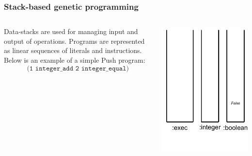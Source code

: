 \documentclass{beamer}
\newcommand{\linespace}{\vskip 0.25cm}
\begin{document}
\begin{frame}
	\frametitle{Stack-based genetic programming}
	\begin{columns}
		\begin{column}{0.65\textwidth}
			Data-stacks are used for managing input and output of operations.
			\linespace
			\linespace
			\linespace
			Programs are represented as linear sequences of literals and instructions. Below is an example of a simple Push program:
			\[\texttt{(1 integer\_add 2 integer\_equal)}\]
		\end{column}
		\begin{column}{0.35\textwidth}
			\includegraphics[height=.7\textheight]{Illustrations/stack_10.PDF}
		\end{column}
	\end{columns}
\end{frame}
\end{document}
